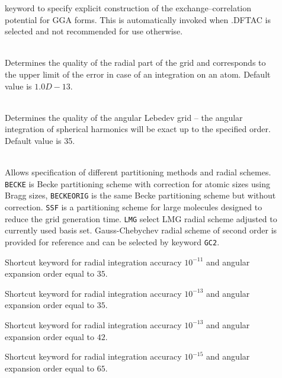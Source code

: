 \begin{description}
\item[]
  keyword to specify explicit construction of the exchange--correlation 
  potential for GGA forms. This is automatically invoked when .DFTAC is selected 
  and not recommended for use otherwise.

\item[]
   \\

  Determines the quality of the radial part of the grid and
  corresponds to the upper limit of the error in case of an
  integration on an atom. Default value is $1.0D-13$.

\item[]
   \\
  Determines the quality of the angular Lebedev grid -- the angular
  integration of spherical harmonics will be exact up to the specified
  order. Default value is 35.
\item[]
   \\
  Allows specification of different partitioning methods and radial
  schemes. \verb|BECKE| is Becke partitioning scheme with correction
  for atomic sizes using Bragg sizes, \verb|BECKEORIG| is the same
  Becke partitioning scheme but without correction. \verb|SSF| is a
  partitioning scheme for large molecules designed to reduce the grid
  generation time. \verb|LMG| select LMG radial scheme adjusted to
  currently used basis set. Gauss-Chebychev radial scheme of second
  order is provided for reference and can be selected by keyword
  \verb|GC2|.

\item[]
  Shortcut keyword for radial integration accuracy $10^{-11}$ and
  angular expansion order equal to $35$.
\item[]
  Shortcut keyword for radial integration accuracy $10^{-13}$ and
  angular expansion order equal to $35$.
\item[]
  Shortcut keyword for radial integration accuracy $10^{-13}$ and
  angular expansion order equal to $42$.
\item[]
  Shortcut keyword for radial integration accuracy $10^{-15}$ and
  angular expansion order equal to $65$.

\end{description}

